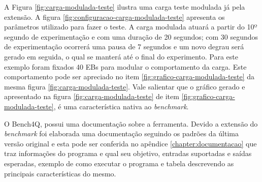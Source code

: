 A Figura \ref{fig:carga-modulada-teste} ilustra uma carga teste modulada já pela extensão. A figura \ref{fig:configuracao-carga-modulada-teste} apresenta os parâmetros utilizado para fazer o teste. A carga modulada atuará a partir do 10º segundo de experimentação e com uma duração de 20 segundos; com 30 segundos de experimentação ocorrerá uma pausa de 7 segundos e um novo degrau será gerado em seguida, o qual se manterá até o final do experimento. Para este exemplo foram fixados 40 EBs para modular o comportamento da carga. Este comportamento pode ser apreciado no item \ref{fig:grafico-carga-modulada-teste} da mesma figura \ref{fig:carga-modulada-teste}. Vale salientar que o gráfico gerado e apresentado na figura \ref{fig:carga-modulada-teste} de item \ref{fig:grafico-carga-modulada-teste}, é uma característica nativa ao \textit{benchmark}.



O Bench4Q, possui uma documentação sobre a ferramenta. Devido a extensão do \textit{benchmark} foi elaborada uma documentação seguindo os padrões da última versão original e esta pode ser conferida no apêndice \ref{chapter:documentacao} que traz informações do programa e qual seu objetivo, entradas suportadas e saídas esperadas, exemplo de como executar o programa e tabela descrevendo as principais características do mesmo.


